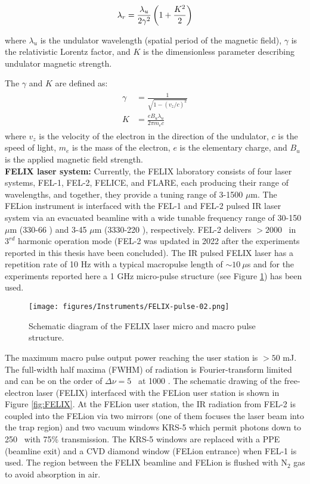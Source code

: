 \[\lambda_r = \frac{\lambda_u}{2\gamma^2} \left( 1 + \frac{K^2}{2} \right)\]

where $\lambda_u$ is the undulator wavelength (spatial period of the magnetic field), $\gamma$ is the relativistic Lorentz factor, and $K$ is the dimensionless parameter describing undulator magnetic strength.

The $\gamma$ and $K$ are defined as:
\begin{align*}
    \begin{split}
        \gamma &= \frac{1}{\sqrt{1-(v_z/c)^2}}\\
        K &= \frac{eB_u\lambda_u}{2\pi m_e c}
    \end{split}
\end{align*}
where $v_z$ is the velocity of the electron in the direction of the undulator, $c$ is the speed of light, $m_e$ is the mass of the electron, $e$ is the elementary charge, and $B_u$ is the applied magnetic field strength.\\

\textbf{FELIX laser system:} Currently, the FELIX laboratory consists of four laser systems, FEL-1, FEL-2, FELICE, and FLARE, each producing their range of wavelengths, and together, they provide a tuning range of 3-1500 $\mu$m. The FELion instrument is interfaced with the FEL-1 and FEL-2 pulsed IR laser system via an evacuated beamline with a wide tunable frequency range of 30-150 $\mu$m (330-66 \wn) and 3-45 $\mu$m (3330-220 \wn), respectively. FEL-2 delivers $> 2000$ \wn\ in $3^{rd}$ harmonic operation mode (FEL-2 was updated in 2022 after the experiments reported in this thesis have been concluded). The IR pulsed FELIX laser has a repetition rate of 10 Hz with a typical macropulse length of $\sim  10\ \mu$s and for the experiments reported here a 1 GHz micro-pulse structure (see Figure \ref{fig:FELIX-pulse}) has been used. 

\begin{figure}[!htb]
    \centering
    \texttt{[image: figures/Instruments/FELIX-pulse-02.png]}
    \caption{Schematic diagram of the FELIX laser micro and macro pulse structure.}
    \label{fig:FELIX-pulse}
\end{figure}

The maximum macro pulse output power reaching the user station is $> 50$ mJ. The full-width half maxima (FWHM) of radiation is Fourier-transform limited and can be on the order of $\Delta \nu = 5$ \wn\ at 1000 \wn. The schematic drawing of the free-electron laser (FELIX) interfaced with the FELion user station is shown in Figure \ref{fig:FELIX}. At the FELion user station, the IR radiation from FEL-2 is coupled into the FELion via two mirrors (one of them focuses the laser beam into the trap region) and two vacuum windows KRS-5 which permit photons down to 250 \wn\ with 75\% transmission. The KRS-5 windows are replaced with a PPE (beamline exit) and a CVD diamond window (FELion entrance) when FEL-1 is used. The region between the FELIX beamline and FELion is flushed with N$_2$ gas to avoid absorption in air.

